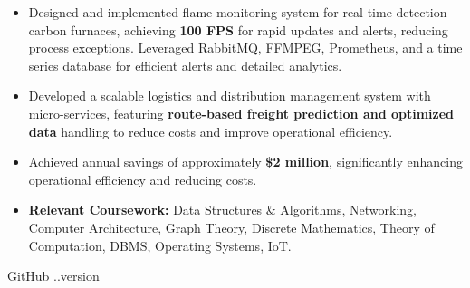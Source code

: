 \documentclass[10pt,a4paper,ragged2e]{classes/altacv}
\begin{document}

\begin{itemize}[itemsep=6pt]
\normalsize

\item Designed and implemented flame monitoring system for real-time detection carbon furnaces, achieving \textbf{100 FPS} for rapid updates and alerts, reducing process exceptions. Leveraged RabbitMQ, FFMPEG, Prometheus, and a time series database for efficient alerts and detailed analytics.

\item  Developed a scalable logistics and distribution management system with micro-services, featuring \textbf{route-based freight prediction and optimized data} handling to reduce costs and improve operational efficiency.

\item Achieved annual savings of approximately \textbf{\$2 million}, significantly enhancing operational efficiency and reducing costs.
\end{itemize}

\vspace{6pt}



\smallskip
\begin{itemize}
    \item \textbf{Relevant Coursework:} Data Structures \& Algorithms, Networking, Computer Architecture, Graph Theory, Discrete Mathematics, Theory of Computation, DBMS, Operating Systems, IoT.
\end{itemize}
\smallskip
\begin{footnotesize}
GitHub \number \month .\number\year.version
\end{footnotesize}
\clearpage
\end{document}

